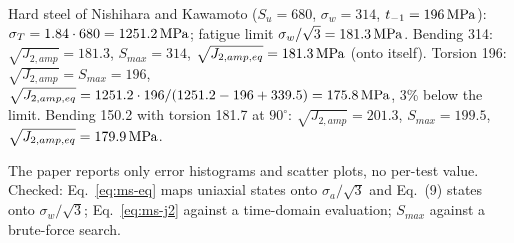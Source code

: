  Hard steel of Nishihara and Kawamoto ($S_u=680$, $\sigma_w=314$,
$t_{-1}=196\,\mathrm{MPa}$): $\sigma_T=1.84\cdot680=1251.2\,\mathrm{MPa}$; fatigue limit $\sigma_w/\sqrt3=181.3\,\mathrm{MPa}$.
Bending 314: $\sqrt{J_{2,amp}}=181.3$, $S_{max}=314$, $\sqrt{J_{2,amp,eq}}=181.3\,\mathrm{MPa}$ (onto itself).
Torsion 196: $\sqrt{J_{2,amp}}=S_{max}=196$, $\sqrt{J_{2,amp,eq}}=1251.2\cdot196/(1251.2-196+339.5)=175.8\,\mathrm{MPa}$,
3\% below the limit. Bending 150.2 with torsion 181.7 at $90^\circ$: $\sqrt{J_{2,amp}}=201.3$,
$S_{max}=199.5$, $\sqrt{J_{2,amp,eq}}=179.9\,\mathrm{MPa}$.

 The paper reports only error histograms and scatter plots, no per-test value.
Checked: Eq.~\eqref{eq:ms-eq} maps uniaxial states onto $\sigma_a/\sqrt3$ and Eq.~(9) states onto
$\sigma_w/\sqrt3$; Eq.~\eqref{eq:ms-j2} against a time-domain evaluation; $S_{max}$ against a
brute-force search.
